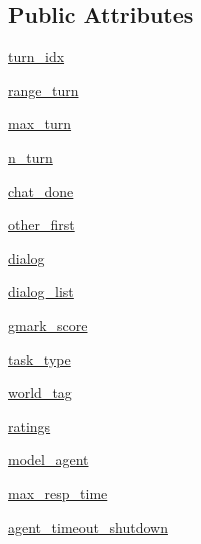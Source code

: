\subsection*{Public Attributes}
\begin{DoxyCompactItemize}
\item 
\hyperlink{classmturk__evaluation__task_1_1worlds_1_1WizardEval_afab3ae9ca53e049a29faab0231174f30}{turn\+\_\+idx}
\item 
\hyperlink{classmturk__evaluation__task_1_1worlds_1_1WizardEval_a9cf6dee77a84e372db1c88e27ecb3dea}{range\+\_\+turn}
\item 
\hyperlink{classmturk__evaluation__task_1_1worlds_1_1WizardEval_ae2fb288f7903cb6694bfc070a6f4f66a}{max\+\_\+turn}
\item 
\hyperlink{classmturk__evaluation__task_1_1worlds_1_1WizardEval_a1e08f6249aaefa374042004b5b9bd806}{n\+\_\+turn}
\item 
\hyperlink{classmturk__evaluation__task_1_1worlds_1_1WizardEval_a5f2cbed68229d4ae80e94e6bacf3b428}{chat\+\_\+done}
\item 
\hyperlink{classmturk__evaluation__task_1_1worlds_1_1WizardEval_ae5ca8fe978bb9b309cd1cade8e767b30}{other\+\_\+first}
\item 
\hyperlink{classmturk__evaluation__task_1_1worlds_1_1WizardEval_ab864f6486b40c4068fa38f746857e1a5}{dialog}
\item 
\hyperlink{classmturk__evaluation__task_1_1worlds_1_1WizardEval_a79287ba53709562c48e0a123cdca1a45}{dialog\+\_\+list}
\item 
\hyperlink{classmturk__evaluation__task_1_1worlds_1_1WizardEval_ad83f2b646ba01bc5ac3f9e906d8df7c4}{gmark\+\_\+score}
\item 
\hyperlink{classmturk__evaluation__task_1_1worlds_1_1WizardEval_a68b6ee1b31112ac740ddc45ed8cc09ee}{task\+\_\+type}
\item 
\hyperlink{classmturk__evaluation__task_1_1worlds_1_1WizardEval_a159f57b257cf77486953e1bb98639b72}{world\+\_\+tag}
\item 
\hyperlink{classmturk__evaluation__task_1_1worlds_1_1WizardEval_a6c0422a864d0f68c1ceaaafb556226d7}{ratings}
\item 
\hyperlink{classmturk__evaluation__task_1_1worlds_1_1WizardEval_a955ab24c052a0f3a9e624b1d1edbc003}{model\+\_\+agent}
\item 
\hyperlink{classmturk__evaluation__task_1_1worlds_1_1WizardEval_af9489d5ec7d0b139d406bf764c90370d}{max\+\_\+resp\+\_\+time}
\item 
\hyperlink{classmturk__evaluation__task_1_1worlds_1_1WizardEval_a0bc0625ef18126cc55b4ad11b7585016}{agent\+\_\+timeout\+\_\+shutdown}

\end{DoxyCompactItemize}
